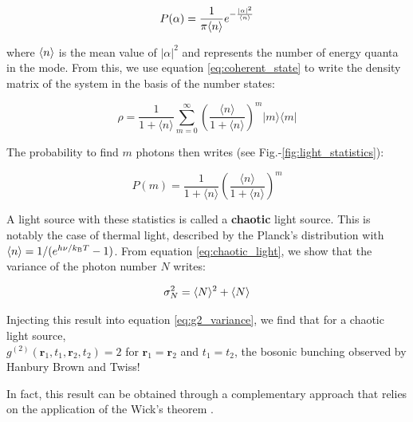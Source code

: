 \begin{equation}
    P(\alpha)= \frac{1}{\pi \langle n\rangle} e^{-\frac{|\alpha|^2}{\langle n\rangle}}
    \label{eq:p_alpha}
\end{equation}

\noindent where $\langle n\rangle$ is the mean value of $|\alpha|^2$ and represents the number of energy quanta in the mode. From this, we use equation \ref{eq:coherent_state} to write the density matrix of the system in the basis of the number states:

\begin{equation}
    \hat{\rho}=\frac{1}{1+\langle n\rangle} \sum_{m=0}^{\infty}\left(\frac{\langle n\rangle}{1+\langle n\rangle}\right)^{m}|m\rangle\langle m|
    \label{eq:rho_chaotic}
\end{equation}

\noindent The probability to find $m$ photons then writes (see Fig.-\ref{fig:light_statistics}):

\begin{equation}
    P(m)=\frac{1}{1+\langle n\rangle}\left(\frac{\langle n\rangle}{1+\langle n\rangle}\right)^{m}
    \label{eq:chaotic_light}
\end{equation}


\noindent A light source with these statistics is called a \textbf{chaotic} light source. This is notably the case of thermal light, described by the Planck's distribution with $\langle n\rangle=1/(e^{h\nu/k_{\mathrm{B}} T}-1)$. From equation \ref{eq:chaotic_light}, we show that the variance of the photon number $N$ writes:

\begin{equation}
    \sigma_N^2=\langle N\rangle^2+\langle N\rangle
\end{equation}

\noindent Injecting this result into equation \ref{eq:g2_variance}, we find that for a chaotic light source, \\ $g^{(2)}\left(\bm{r}_{1}, t_{1}, \bm{r}_{2}, t_{2}\right)=2$ for $\bm{r}_{1}=\bm{r}_{2}$ and $t_1=t_2$, the bosonic bunching observed by Hanbury Brown and Twiss!




In fact, this result can be obtained through a complementary approach that relies on the application of the Wick's theorem \cite{gardiner2004quantum}.

